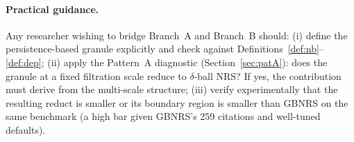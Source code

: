 \paragraph{Practical guidance.}
Any researcher wishing to bridge Branch~A and Branch~B should:
(i) define the persistence-based granule explicitly and check
    against Definitions~\ref{def:nb}--\ref{def:dep};
(ii) apply the Pattern~A diagnostic (Section~\ref{sec:patA}): does the
     granule at a fixed filtration scale reduce to $\delta$-ball NRS?  If
     yes, the contribution must derive from the multi-scale structure;
(iii) verify experimentally that the resulting reduct is smaller or its
     boundary region is smaller than GBNRS on the same benchmark (a high bar
     given GBNRS's 259 citations and well-tuned defaults).
